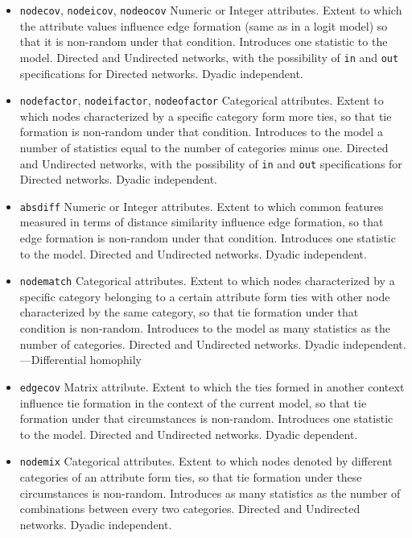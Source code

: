 \documentclass[
]{article}
\begin{document}
\begin{itemize}
\item
  \texttt{nodecov}, \texttt{nodeicov}, \texttt{nodeocov} Numeric or
  Integer attributes. Extent to which the attribute values influence
  edge formation (same as in a logit model) so that it is non-random
  under that condition. Introduces one statistic to the model. Directed
  and Undirected networks, with the possibility of \texttt{in} and
  \texttt{out} specifications for Directed networks. Dyadic independent.
\item
  \texttt{nodefactor}, \texttt{nodeifactor}, \texttt{nodeofactor}
  Categorical attributes. Extent to which nodes characterized by a
  specific category form more ties, so that tie formation is non-random
  under that condition. Introduces to the model a number of statistics
  equal to the number of categories minus one. Directed and Undirected
  networks, with the possibility of \texttt{in} and \texttt{out}
  specifications for Directed networks. Dyadic independent.
\item
  \texttt{absdiff} Numeric or Integer attributes. Extent to which common
  features measured in terms of distance similarity influence edge
  formation, so that edge formation is non-random under that condition.
  Introduces one statistic to the model. Directed and Undirected
  networks. Dyadic independent.
\item
  \texttt{nodematch} Categorical attributes. Extent to which nodes
  characterized by a specific category belonging to a certain attribute
  form ties with other node characterized by the same category, so that
  tie formation under that condition is non-random. Introduces to the
  model as many statistics as the number of categories. Directed and
  Undirected networks. Dyadic independent. ---Differential homophily
\item
  \texttt{edgecov} Matrix attribute. Extent to which the ties formed in
  another context influence tie formation in the context of the current
  model, so that tie formation under that circumstances is non-random.
  Introduces one statistic to the model. Directed and Undirected
  networks. Dyadic dependent.
\item
  \texttt{nodemix} Categorical attributes. Extent to which nodes denoted
  by different categories of an attribute form ties, so that tie
  formation under these circumstances is non-random. Introduces as many
  statistics as the number of combinations between every two categories.
  Directed and Undirected networks. Dyadic independent.
\end{itemize}
\end{document}
